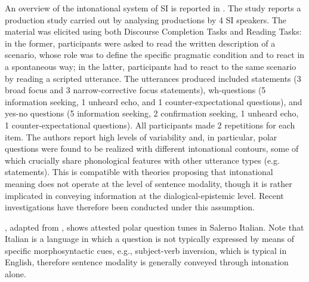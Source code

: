 \documentclass[output=paper,colorlinks,citecolor=brown]{langscibook}
\begin{document}
An overview of the intonational system of SI is reported in \citet{orrico19}. The study reports a production study carried out by analysing productions by 4 SI speakers. The material was elicited using both Discourse Completion Tasks and Reading Tasks: in the former, participants were asked to read the written description of a scenario, whose role was to define the specific pragmatic condition and to react in a spontaneous way; in the latter, participants had to react to the same scenario by reading a scripted utterance. The utterances produced included statements (3 broad focus and 3 narrow-corrective focus statements), wh-questions (5 information seeking, 1 unheard echo, and 1 counter-expectational questions), and yes-no questions (5 information seeking, 2 confirmation seeking, 1 unheard echo, 1 counter-expectational questions). All participants made 2 repetitions for each item. The authors report high levels of variability and, in particular, polar questions were found to be realized with different intonational contours, some of which crucially share phonological features with other utterance types (e.g. statements). This is compatible with theories proposing that intonational meaning does not operate at the level of sentence modality, though it is rather implicated in conveying information at the dialogical-epistemic level. Recent investigations \citep{Orrico+2020, orrico2022} have therefore been conducted under this assumption.

, adapted from \citet{orrico19}, shows attested polar question tunes in Salerno Italian. Note that Italian is a language in which a question is not typically expressed by means of specific morphosyntactic cues, e.g., subject-verb inversion, which is typical in English, therefore sentence modality is generally conveyed through intonation alone.
\end{document}
